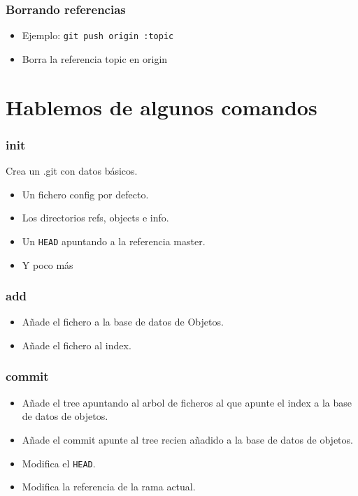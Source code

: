 \documentclass[10pt]{beamer}
\begin{document}
  \begin{frame}[containsverbatim]
    \frametitle{Borrando referencias}
    \begin{itemize}
        \item Ejemplo: \verb$git push origin :topic$
        \item Borra la referencia topic en origin
    \end{itemize}
  \end{frame}

  \section*{Hablemos de algunos comandos}

  \begin{frame}[containsverbatim]
    \frametitle{init}
    Crea un .git con datos básicos.
    \begin{itemize}
      \item Un fichero config por defecto.
      \item Los directorios refs, objects e info.
      \item Un \verb+HEAD+ apuntando a la referencia master.
      \item Y poco más
    \end{itemize}
  \end{frame}

  \begin{frame}[containsverbatim]
    \frametitle{add}
    \begin{itemize}
      \item Añade el fichero a la base de datos de Objetos.
      \item Añade el fichero al index.
    \end{itemize}
  \end{frame}

  \begin{frame}[containsverbatim]
    \frametitle{commit}
    \begin{itemize}
      \item Añade el tree apuntando al arbol de ficheros al que apunte el index a la base de datos de objetos.
      \item Añade el commit apunte al tree recien añadido a la base de datos de objetos.
      \item Modifica el \verb+HEAD+.
      \item Modifica la referencia de la rama actual.
    \end{itemize}
  \end{frame}
\end{document}
